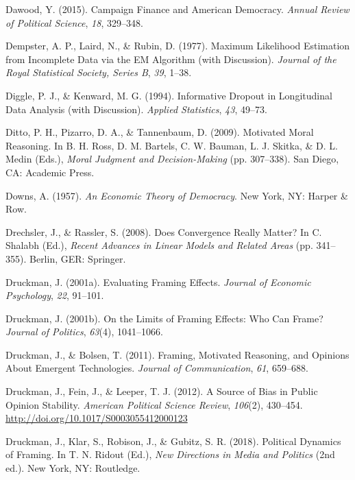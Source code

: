 \documentclass[12pt,econ]{sources/authesis}
\begin{document}
\leavevmode\hypertarget{ref-dawood_campaign_2015}{}%
Dawood, Y. (2015). Campaign Finance and American Democracy. \emph{Annual Review of Political Science}, \emph{18}, 329--348.

\leavevmode\hypertarget{ref-dempster_1977_maximum}{}%
Dempster, A. P., Laird, N., \& Rubin, D. (1977). Maximum Likelihood Estimation from Incomplete Data via the EM Algorithm (with Discussion). \emph{Journal of the Royal Statistical Society, Series B}, \emph{39}, 1--38.

\leavevmode\hypertarget{ref-diggle_1994_informative}{}%
Diggle, P. J., \& Kenward, M. G. (1994). Informative Dropout in Longitudinal Data Analysis (with Discussion). \emph{Applied Statistics}, \emph{43}, 49--73.

\leavevmode\hypertarget{ref-ditto_motivated_2009}{}%
Ditto, P. H., Pizarro, D. A., \& Tannenbaum, D. (2009). Motivated Moral Reasoning. In B. H. Ross, D. M. Bartels, C. W. Bauman, L. J. Skitka, \& D. L. Medin (Eds.), \emph{Moral Judgment and Decision-Making} (pp. 307--338). San Diego, CA: Academic Press.

\leavevmode\hypertarget{ref-downs_economic_1957}{}%
Downs, A. (1957). \emph{An Economic Theory of Democracy}. New York, NY: Harper \& Row.

\leavevmode\hypertarget{ref-drechsler_2008_does}{}%
Drechsler, J., \& Rassler, S. (2008). Does Convergence Really Matter? In C. Shalabh (Ed.), \emph{Recent Advances in Linear Models and Related Areas} (pp. 341--355). Berlin, GER: Springer.

\leavevmode\hypertarget{ref-druckman_evaluating_2001}{}%
Druckman, J. (2001a). Evaluating Framing Effects. \emph{Journal of Economic Psychology}, \emph{22}, 91--101.

\leavevmode\hypertarget{ref-druckman_limits_2001}{}%
Druckman, J. (2001b). On the Limits of Framing Effects: Who Can Frame? \emph{Journal of Politics}, \emph{63}(4), 1041--1066.

\leavevmode\hypertarget{ref-druckman_framing_2011}{}%
Druckman, J., \& Bolsen, T. (2011). Framing, Motivated Reasoning, and Opinions About Emergent Technologies. \emph{Journal of Communication}, \emph{61}, 659--688.

\leavevmode\hypertarget{ref-druckman_source_2012}{}%
Druckman, J., Fein, J., \& Leeper, T. J. (2012). A Source of Bias in Public Opinion Stability. \emph{American Political Science Review}, \emph{106}(2), 430--454. \url{http://doi.org/10.1017/S0003055412000123}

\leavevmode\hypertarget{ref-druckman_political_2018}{}%
Druckman, J., Klar, S., Robison, J., \& Gubitz, S. R. (2018). Political Dynamics of Framing. In T. N. Ridout (Ed.), \emph{New Directions in Media and Politics} (2nd ed.). New York, NY: Routledge.
\end{document}
